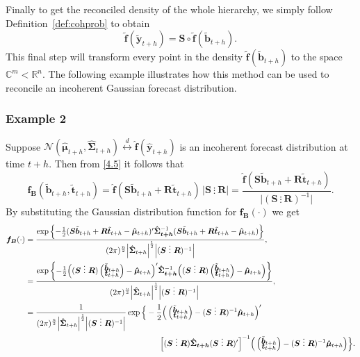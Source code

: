 \documentclass[a4paper, 11pt]{article}
\def\bt{\begin{pmatrix}\tilde{\bm{b}}_{t+h}\\[-0.2cm]\tilde{\bm{t}}_{t+h}\end{pmatrix}}
\begin{document}
Finally to get the reconciled density of the whole hierarchy, we simply follow Definition~\ref{def:cohprob} to obtain
\begin{equation}\label{4.7}
\tilde{\bm{f}}(\tilde{\bm{y}}_{t+h})=\bm{S}\circ \tilde{\bm{f}}(\tilde{\bm{b}}_{t+h}).
\end{equation}
This final step will transform every point in the density $\tilde{\bm{f}}(\tilde{\bm{b}}_{t+h})$ to the space $\mathbb{C}^m<\mathbb{R}^n$. The following example illustrates how this method can be used to reconcile an incoherent Gaussian forecast distribution.

\subsubsection*{Example 2}

Suppose $\mathcal{N}(\hat{\bm{\mu}}_{t+h}, \hat{\bm{\Sigma}}_{t+h}) \overset{d}{\leftrightarrow} \hat{\bm{f}}(\hat{\bm{y}}_{t+h})$ is an incoherent forecast distribution at time $t+h$. Then from \eqref{4.5} it follows that
\begin{equation}
\bm{f_B}(\tilde{\bm{b}}_{t+h},\tilde{\bm{t}}_{t+h})=\hat{\bm{f}}(\bm{S}\tilde{\bm{b}}_{t+h}+\bm{R}\tilde{\bm{t}}_{t+h}) \, \Big|\bm{S} ~ \vdots~ \bm{R}\Big| = \frac{\hat{\bm{f}}(\bm{S}\tilde{\bm{b}}_{t+h}+\bm{R}\tilde{\bm{t}}_{t+h}) }{\Big|(\bm{S} ~ \vdots~ \bm{R})^{-1}\Big|}.
\end{equation}
By substituting the Gaussian distribution function for $\bm{f_B}(\cdot)$ we get
\begin{align*}
\bm{f_B}(\cdot)
& =
\frac{\exp\left\{-\frac{1}{2}(\bm{S}\tilde{\bm{b}}_{t+h}+\bm{R}\tilde{\bm{t}}_{t+h}-\bm{\hat{\mu}}_{t+h})' \bm{\hat{\Sigma}_{t+h}}^{-1}(\bm{S}\tilde{\bm{b}}_{t+h}+\bm{R}\tilde{\bm{t}}_{t+h}-\bm{\hat{\mu}}_{t+h})\right\}}{(2\pi)^{\frac{n}{2}}\Big|\bm{\hat{\Sigma}}_{t+h}\Big|^{\frac{1}{2}}\Big|(\bm{S} ~ \vdots~ \bm{R})^{-1}\Big|},\\
& =
\frac{\exp\left\{-\frac{1}{2}\Big((\bm{S} ~ \vdots~ \bm{R})\bt-\bm{\hat{\mu}}_{t+h}\Big)' \bm{\hat{\Sigma}_{t+h}}^{-1}\Big((\bm{S} ~ \vdots~ \bm{R})\bt-\bm{\hat{\mu}}_{t+h}\Big)\right\}}{(2\pi)^{\frac{n}{2}}\Big|\bm{\hat{\Sigma}}_{t+h}\Big|^{\frac{1}{2}}\Big|(\bm{S} ~ \vdots~ \bm{R})^{-1}\Big|},\\
& =
\frac{1}{(2\pi)^{\frac{n}{2}}\Big|\bm{\hat{\Sigma}}_{t+h}\Big|^{\frac{1}{2}}\Big|(\bm{S} ~ \vdots~ \bm{R})^{-1} \Big|}
\exp \Big\{-\frac{1}{2}\Big(\bt-(\bm{S} ~ \vdots~ \bm{R})^{-1}\bm{\hat{\mu}}_{t+h}\Big)'\\
& \hspace*{6cm} \Big[(\bm{S} ~ \vdots~ \bm{R})\bm{\hat{\Sigma}_{t+h}}(\bm{S} ~ \vdots~ \bm{R})'\Big]^{-1}
\Big(\bt-(\bm{S} ~ \vdots~ \bm{R})^{-1}\bm{\hat{\mu}}_{t+h}\Big) \Big\}.
\end{align*}
\end{document}
